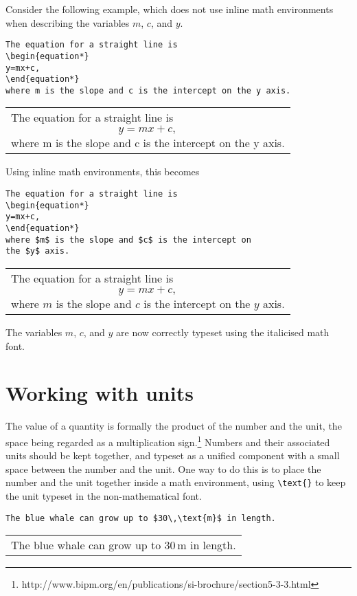 \documentclass[a4paper]{tufte-handout}
\begin{document}
Consider the following example, which does not use inline math environments when describing the variables $m$, $c$, and $y$.
\begin{lstlisting}
The equation for a straight line is
\begin{equation*}
y=mx+c,
\end{equation*}
where m is the slope and c is the intercept on the y axis.
\end{lstlisting}

\begin{tabular}{|p{10cm}}
  The equation for a straight line is
  \begin{equation*}
  y=mx+c,
  \end{equation*}
  where m is the slope and c is the intercept on the y axis.
\end{tabular}

Using inline math environments, this becomes
\begin{lstlisting}
The equation for a straight line is
\begin{equation*}
y=mx+c,
\end{equation*}
where $m$ is the slope and $c$ is the intercept on 
the $y$ axis.
\end{lstlisting}
\begin{tabular}{|p{10cm}}
  The equation for a straight line is
  \begin{equation*}
  y=mx+c,
  \end{equation*}
  where $m$ is the slope and $c$ is the intercept on the $y$ axis.
\end{tabular}

The variables $m$, $c$, and $y$ are now correctly typeset using the italicised math font.

\section{Working with units}
The value of a quantity is formally the product of the number and the unit, the space being regarded as a multiplication sign.\footnote{http://www.bipm.org/en/publications/si-brochure/section5-3-3.html} Numbers and their associated units should be kept together, and typeset as a unified component with a small space between the number and the unit. One way to do this is to place the number and the unit together inside a math environment, using \lstinline$\text{}$ to keep the unit typeset in the non-mathematical font.
\begin{lstlisting}
The blue whale can grow up to $30\,\text{m}$ in length.
\end{lstlisting}
\begin{tabular}{|p{10cm}}
The blue whale can grow up to $30\,\text{m}$ in length.
\end{tabular}
\end{document}
